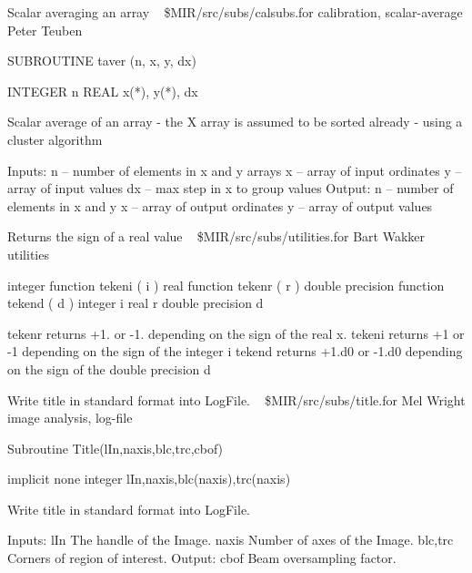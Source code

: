 %
\noindent Scalar averaging an array
\newline \ 
\newline {} \$MIR/src/subs/calsubs.for
\newline {} calibration, scalar-average
\newline {} Peter Teuben
\par{\tenpoint
{\eightpoint\begintt
        SUBROUTINE taver (n, x, y, dx)

        INTEGER n
        REAL    x(*), y(*), dx

   Scalar average of an array - the X array is assumed to be
       sorted already - using a cluster algorithm

  Inputs:
       n    -- number of elements in x and y arrays
       x    -- array of input ordinates
       y    -- array of input values
       dx   -- max step in x to group values
  Output:
       n    -- number of elements in x and y
       x    -- array of output ordinates
       y    -- array of output values
\endtt}
\par}
%
\noindent Returns the sign of a real value
\newline \ 
\newline {} \$MIR/src/subs/utilities.for
\newline {} Bart Wakker
\newline \abox{Keywords:} utilities
\par{\tenpoint
{\eightpoint\begintt
     integer          function tekeni ( i )
     real             function tekenr ( r )
     double precision function tekend ( d )
     integer          i
     real             r
     double precision d

 tekenr returns +1.   or -1.   depending on the sign of the real x.
 tekeni returns +1    or -1    depending on the sign of the integer i
 tekend returns +1.d0 or -1.d0 depending on the sign of the double precision d
\endtt}
\par}
%
\noindent Write title in standard format into LogFile.
\newline \ 
\newline {} \$MIR/src/subs/title.for
\newline \abox{Responsible:} Mel Wright
\newline {} image analysis, log-file
\par{\tenpoint
{\eightpoint\begintt
        Subroutine Title(lIn,naxis,blc,trc,cbof)

        implicit none
        integer lIn,naxis,blc(naxis),trc(naxis)

   Write title in standard format into LogFile.

  Inputs:
    lIn        The handle of the Image.
    naxis      Number of axes of the Image.
    blc,trc    Corners of region of interest.
  Output:
    cbof       Beam oversampling factor.
\endtt}
\par}
